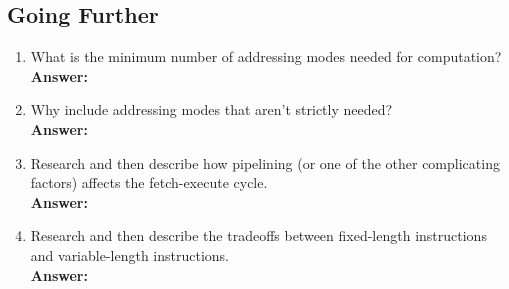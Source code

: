 \documentclass[12pt]{article}
\begin{document}
\subsection*{Going Further}
\begin{enumerate}
    \item What is the minimum number of addressing modes needed for computation? \\
        \textbf{Answer:}
    \item Why include addressing modes that aren't strictly needed? \\
        \textbf{Answer:}
    \item Research and then describe how pipelining (or one of the other complicating factors) affects the fetch-execute cycle. \\
        \textbf{Answer:}
    \item Research and then describe the tradeoffs between fixed-length instructions and variable-length instructions. \\
        \textbf{Answer:}
\end{enumerate}
\end{document}
